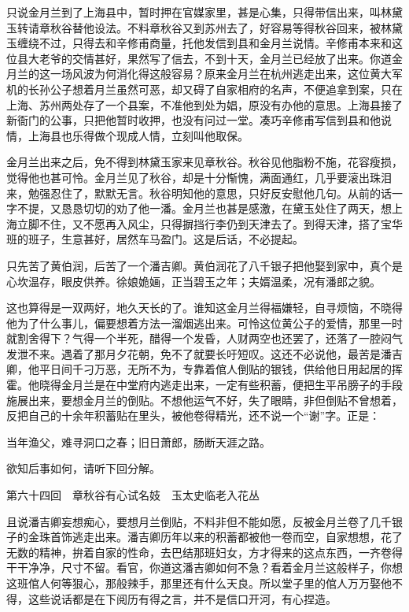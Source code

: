 \documentclass[12pt,UTF8]{ctexbook}
\begin{document}
{{{只说金月兰到了上海县中，暂时押在官媒家里，甚是心集，只得带信出来，叫林黛玉转请章秋谷替他设法。不料章秋谷又到苏州去了，好容易等得秋谷回来，被林黛玉缠绕不过，只得去和辛修甫商量，托他发信到县和金月兰说情。辛修甫本来和这位县大老爷的交情甚好，果然写了信去，不到十天，金月兰已经放了出来。你道金月兰的这一场风波为何消化得这般容易？原来金月兰在杭州逃走出来，这位黄大军机的长孙公子想着月兰虽然可恶，却又碍了自家相府的名声，不便追拿到案，只在上海、苏州两处存了一个县案，不准他到处为娼，原没有办他的意思。上海县接了新衙门的公事，只把他暂时收押，也没有问过一堂。凑巧辛修甫写信到县和他说情，上海县也乐得做个现成人情，立刻叫他取保。

金月兰出来之后，免不得到林黛玉家来见章秋谷。秋谷见他脂粉不施，花容瘦损，觉得他也甚可怜。金月兰见了秋谷，却是十分惭愧，满面通红，几乎要滚出珠泪来，勉强忍住了，默默无言。秋谷明知他的意思，只好反安慰他几句。从前的话一字不提，又恳恳切切的劝了他一潘。金月兰也甚是感激，在黛玉处住了两天，想上海立脚不住，又不愿再入风尘，只得摒挡行李仍到天津去了。到得天津，搭了宝华班的班子，生意甚好，居然车马盈门。这是后话，不必提起。

只先苦了黄伯润，后苦了一个潘吉卿。黄伯润花了八千银子把他娶到家中，真个是心坎温存，眼皮供养。徐娘姽婳，正当碧玉之年；夫婿温柔，况有潘郎之貌。

这也算得是一双两好，地久天长的了。谁知这金月兰得福嫌轻，自寻烦恼，不晓得他为了什么事儿，偏要想着方法一溜烟逃出来。可怜这位黄公子的爱情，那里一时就割舍得下？气得一个半死，醋得一个发昏，人财两空也还罢了，还落了一腔闷气发泄不来。遇着了那月夕花朝，免不了就要长吁短叹。这还不必说他，最苦是潘吉卿，他平日间千刁万恶，无所不为，专靠着倌人倒贴的银钱，供给他日用起居的挥霍。他晓得金月兰是在中堂府内逃走出来，一定有些积蓄，便把生平吊膀子的手段施展出来，要想金月兰的倒贴。不想他运气不好，失了眼睛，非但倒贴不曾想着，反把自己的十余年积蓄贴在里头，被他卷得精光，还不说一个“谢”字。正是：

当年渔父，难寻洞口之春；旧日萧郎，肠断天涯之路。

欲知后事如何，请听下回分解。





第六十四回　章秋谷有心试名妓　玉太史临老入花丛





且说潘吉卿妄想痴心，要想月兰倒贴，不料非但不能如愿，反被金月兰卷了几千银子的金珠首饰逃走出来。潘吉卿历年以来的积蓄都被他一卷而空，自家想想，花了无数的精神，拚着自家的性命，去巴结那班妇女，方才得来的这点东西，一齐卷得干干净净，尺寸不留。看官，你道这潘吉卿如何不急？看着金月兰这般样子，你想这班倌人何等狠心，那般辣手，那里还有什么天良。所以堂子里的倌人万万娶他不得，这些说话都是在下阅历有得之言，并不是信口开河，有心捏造。

}}}
\end{document}
